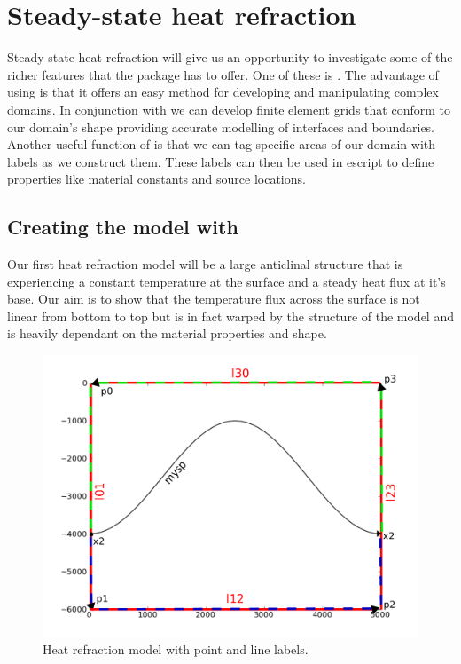 
%
%
%

\section{Steady-state heat refraction}
Steady-state heat refraction will give us an opportunity to investigate some of the richer features that the \esc package has to offer. One of these is \pycad . The advantage of using \pycad is that it offers an easy method for developing and manipulating complex domains. In conjunction with \gmsh we can develop finite element grids that conform to our domain's shape providing accurate modelling of interfaces and boundaries. Another useful function of \pycad is that we can tag specific areas of our domain with labels as we construct them. These labels can then be used in escript to define properties like material constants and source locations. 

\subsection{Creating the model with \pycad}

Our first heat refraction model will be a large anticlinal structure that is experiencing a constant temperature at the surface and a steady heat flux at it's base. Our aim is to show that the temperature flux across the surface is not linear from bottom to top but is in fact warped by the structure of the model and is heavily dependant on the material properties and shape.

\begin{figure}[h!]
\centerline{\includegraphics[width=4.in]{figures/anticlineheatrefraction}}
\caption{Heat refraction model with point and line labels.}
\label{fig:anticlinehrmodel}
\end{figure}

